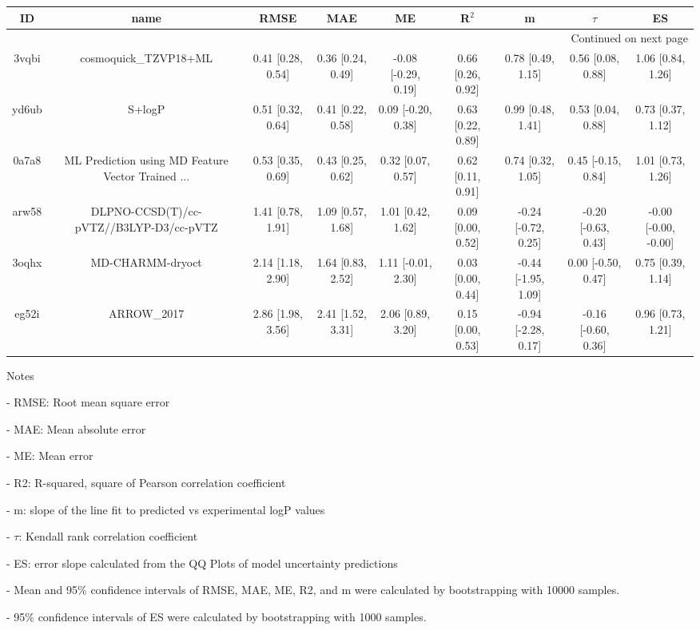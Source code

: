 \documentclass{article}
\begin{document}
\begin{center}
\scriptsize
\begin{longtable}{|ccccccccc|}
\toprule
    ID &                                               name &               RMSE &                MAE &                   ME &              R$^2$ &                    m &               $\tau$ &                    ES \\
\midrule
\endhead
\midrule
\multicolumn{9}{r}{{Continued on next page}} \\
\midrule
\endfoot

\bottomrule
\endlastfoot
 3vqbi &                              cosmoquick\_TZVP18+ML &  0.41 [0.28, 0.54] &  0.36 [0.24, 0.49] &  -0.08 [-0.29, 0.19] &  0.66 [0.26, 0.92] &    0.78 [0.49, 1.15] &    0.56 [0.08, 0.88] &     1.06 [0.84, 1.26] \\
 yd6ub &                                             S+logP &  0.51 [0.32, 0.64] &  0.41 [0.22, 0.58] &   0.09 [-0.20, 0.38] &  0.63 [0.22, 0.89] &    0.99 [0.48, 1.41] &    0.53 [0.04, 0.88] &     0.73 [0.37, 1.12] \\
 0a7a8 &  ML Prediction using MD Feature Vector Trained ... &  0.53 [0.35, 0.69] &  0.43 [0.25, 0.62] &    0.32 [0.07, 0.57] &  0.62 [0.11, 0.91] &    0.74 [0.32, 1.05] &   0.45 [-0.15, 0.84] &     1.01 [0.73, 1.26] \\
 arw58 &            DLPNO-CCSD(T)/cc-pVTZ//B3LYP-D3/cc-pVTZ &  1.41 [0.78, 1.91] &  1.09 [0.57, 1.68] &    1.01 [0.42, 1.62] &  0.09 [0.00, 0.52] &  -0.24 [-0.72, 0.25] &  -0.20 [-0.63, 0.43] &  -0.00 [-0.00, -0.00] \\
 3oqhx &                                   MD-CHARMM-dryoct &  2.14 [1.18, 2.90] &  1.64 [0.83, 2.52] &   1.11 [-0.01, 2.30] &  0.03 [0.00, 0.44] &  -0.44 [-1.95, 1.09] &   0.00 [-0.50, 0.47] &     0.75 [0.39, 1.14] \\
 eg52i &                                        ARROW\_2017 &  2.86 [1.98, 3.56] &  2.41 [1.52, 3.31] &    2.06 [0.89, 3.20] &  0.15 [0.00, 0.53] &  -0.94 [-2.28, 0.17] &  -0.16 [-0.60, 0.36] &     0.96 [0.73, 1.21] \\
\end{longtable}
\end{center}

Notes

- RMSE: Root mean square error

- MAE: Mean absolute error

- ME: Mean error

- R2: R-squared, square of Pearson correlation coefficient

- m: slope of the line fit to predicted vs experimental logP values

- $\tau$:  Kendall rank correlation coefficient

- ES: error slope calculated from the QQ Plots of model uncertainty predictions

- Mean and 95\% confidence intervals of RMSE, MAE, ME, R2, and m were calculated by bootstrapping with 10000 samples.

- 95\% confidence intervals of ES were calculated by bootstrapping with 1000 samples.\end{document}
\end{document}
